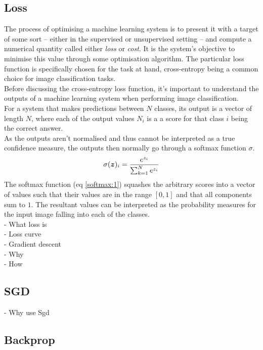 \documentclass{report}
\begin{document}
	\subsection{Loss}
	The process of optimising a machine learning system is to present it with a target of some sort -- either in the supervised or unsupervised setting -- and compute a numerical quantity called either \textit{loss} or \textit{cost}. It is the system's objective to minimise this value through some optimisation algorithm. The particular loss function is specifically chosen for the task at hand, cross-entropy being a common choice for image classification tasks. \\
	Before discussing the cross-entropy loss function, it's important to understand the outputs of a machine learning system when performing image classification. \\
	For a system that makes predictions between $N$ classes, its output is a vector of length $N$, where each of the output values $N_i$ is a a score for that class $i$ being the correct answer. \\
	As the outputs aren't normalised and thus cannot be interpreted as a true confidence measure, the outputs then normally go through a softmax function $\sigma$.
	\begin{equation} \label{softmax:1}
	\sigma(\bm{z})_i = \frac{e^{z_i}}{\sum_{k=1}^{N}e^{z_i}} \\
	\end{equation}
	The softmax function (eq \ref{softmax:1}) squashes the arbitrary scores into a vector of values such that their values are in the range $[0, 1]$ and that all components sum to $1$. The resultant values can be interpreted as the probability measures for the input image falling into each of the classes. \\
	- What loss is \\
	- Loss curve \\
	- Gradient descent \\
		- Why \\
		- How \\
	\subsection{SGD}
	- Why use Sgd
	
	\subsection{Backprop}
\end{document}
